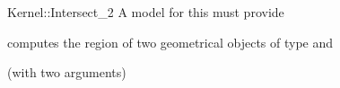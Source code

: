 \begin{ccRefFunctionObjectConcept}{Kernel::Intersect_2}
A model for this must provide


  {computes the  region of two geometrical objects of type 
     and }

\ccRefines
{} (with two arguments)

\ccSeeAlso
{}\\

\end{ccRefFunctionObjectConcept}
